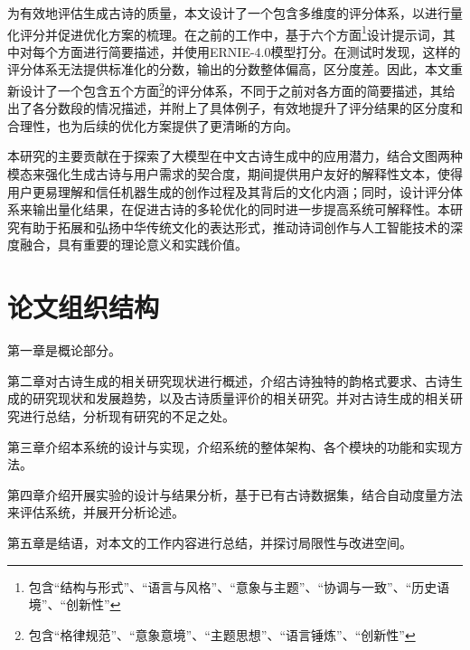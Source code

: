 为有效地评估生成古诗的质量，本文设计了一个包含多维度的评分体系，以进行量化评分并促进优化方案的梳理。在之前的工作中，基于六个方面\footnote{包含“结构与形式”、“语言与风格”、“意象与主题”、“协调与一致”、“历史语境”、“创新性”}设计提示词，其中对每个方面进行简要描述，并使用ERNIE-4.0模型打分。在测试时发现，这样的评分体系无法提供标准化的分数，输出的分数整体偏高，区分度差。因此，本文重新设计了一个包含五个方面\footnote{包含“格律规范”、“意象意境”、“主题思想”、“语言锤炼”、“创新性”}的评分体系，不同于之前对各方面的简要描述，其给出了各分数段的情况描述，并附上了具体例子，有效地提升了评分结果的区分度和合理性，也为后续的优化方案提供了更清晰的方向。

本研究的主要贡献在于探索了大模型在中文古诗生成中的应用潜力，结合文图两种模态来强化生成古诗与用户需求的契合度，期间提供用户友好的解释性文本，使得用户更易理解和信任机器生成的创作过程及其背后的文化内涵；同时，设计评分体系来输出量化结果，在促进古诗的多轮优化的同时进一步提高系统可解释性。本研究有助于拓展和弘扬中华传统文化的表达形式，推动诗词创作与人工智能技术的深度融合，具有重要的理论意义和实践价值。

\section{论文组织结构}

    第一章是概论部分。
    
    第二章对古诗生成的相关研究现状进行概述，介绍古诗独特的韵格式要求、古诗生成的研究现状和发展趋势，以及古诗质量评价的相关研究。并对古诗生成的相关研究进行总结，分析现有研究的不足之处。

    第三章介绍本系统的设计与实现，介绍系统的整体架构、各个模块的功能和实现方法。

    第四章介绍开展实验的设计与结果分析，基于已有古诗数据集，结合自动度量方法来评估系统，并展开分析论述。

    第五章是结语，对本文的工作内容进行总结，并探讨局限性与改进空间。